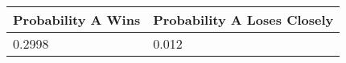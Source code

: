 \begin{tabular}{ll}
Probability A Wins & Probability A Loses Closely \\ 
\hline 
0.2998 & 0.012 \\ 
\hline 
\end{tabular}